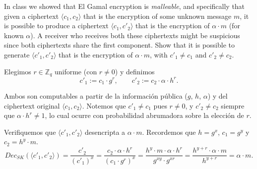 \documentclass[12pt,addpoints,answers]{exam}
\begin{document}
\begin{questions}


\question[10] In class we showed that El Gamal encryption is {\em malleable}, and specifically that given a ciphertext $\langle c_1,c_2\rangle$ that is the encryption of some unknown message $m$, it is possible to produce a ciphertext $\langle c_1,c'_2\rangle$ that is the encryption of $\alpha\cdot m$ (for known $\alpha$). A receiver who receives both these ciphertexts might be suspicious since both ciphertexts share the first component. Show that it is possible to generate $\langle c'_1,c'_2\rangle$ that is the encryption of $\alpha\cdot m$, with $c'_1\neq c_1$ and $c'_2\neq c_2$.
\begin{solution}
  Elegimos $r \in \mathbb{Z}_q$ uniforme (con $r \neq 0$) y definimos
  $$c'_1 := c_1 \cdot g^r, \qquad c'_2 := c_2 \cdot \alpha \cdot h^r.$$

  Ambos son computables a partir de la información pública ($g$, $h$, $\alpha$) y del ciphertext original $\langle c_1, c_2\rangle$. Notemos que $c'_1 \neq c_1$ pues $r \neq 0$, y $c'_2 \neq c_2$ siempre que $\alpha \cdot h^r \neq 1$, lo cual ocurre con probabilidad abrumadora sobre la elección de $r$.

  Verifiquemos que $\langle c'_1, c'_2\rangle$ desencripta a $\alpha \cdot m$. Recordemos que $h = g^x$, $c_1 = g^y$ y $c_2 = h^y \cdot m$.
  $$Dec_{SK}(\langle c'_1, c'_2 \rangle) = \frac{c'_2}{(c'_1)^x} = \frac{c_2 \cdot \alpha \cdot h^r}{(c_1 \cdot g^r)^x} = \frac{h^y \cdot m \cdot \alpha \cdot h^r}{g^{xy} \cdot g^{xr}} = \frac{h^{y+r} \cdot \alpha \cdot m}{h^{y+r}} = \alpha \cdot m.$$


\end{solution}
\end{questions}
\end{document}
